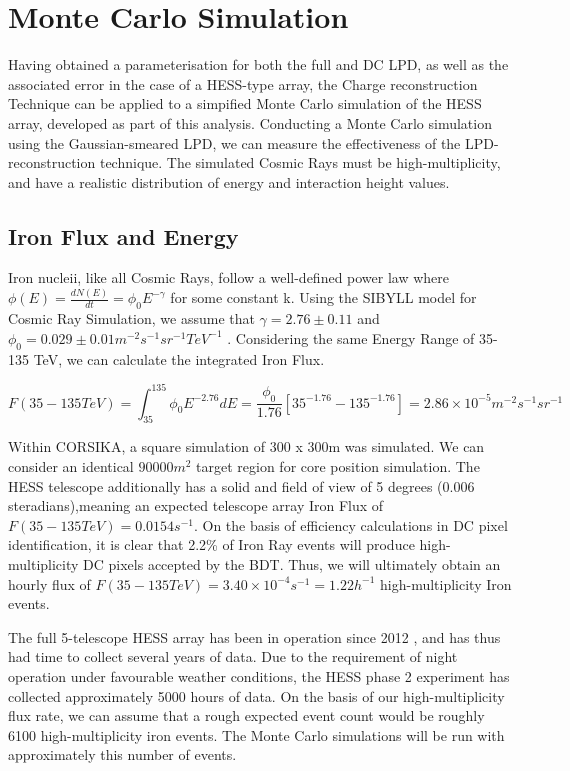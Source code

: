 \documentclass[11pt]{article}
\begin{document}
\section{Monte Carlo Simulation}
Having obtained a parameterisation for both the full and DC LPD, as well as the associated error in the case of a HESS-type array, the Charge reconstruction Technique can be applied to a simpified Monte Carlo simulation of the HESS array, developed as part of this analysis. Conducting a Monte Carlo simulation using the Gaussian-smeared LPD, we can measure the effectiveness of the LPD-reconstruction technique. The simulated Cosmic Rays must be high-multiplicity, and have a realistic distribution of energy and interaction height values.

\subsection{Iron Flux and Energy}
Iron nucleii, like all Cosmic Rays, follow a well-defined power law where $\phi(E) = \frac{dN(E)}{dt} = \phi_{0} E^{-\gamma} $ for some constant k. Using the SIBYLL model for Cosmic Ray Simulation, we assume that $ \gamma = 2.76 \pm 0.11 $ and $\phi_{0}=0.029 \pm 0.01 m^{-2} s^{-1} sr^{-1} TeV ^{-1}$ \cite{hess07}. Considering the same Energy Range of 35-135 TeV, we can calculate the integrated Iron Flux. 

\[ F(35-135TeV) = \int_{35}^{135} \phi_{0} E^{-2.76} dE = \frac{\phi_{0}}{1.76}[35^{-1.76} - 135^{-1.76}] = 2.86 \times 10^{-5} m^{-2} s^{-1} sr^{-1}\]

Within CORSIKA, a square simulation of 300 x 300m was simulated. We can consider an identical $90000 m^{2}$ target region for core position simulation. The HESS telescope additionally has a solid and field of view of 5 degrees (0.006 steradians),meaning an expected telescope array Iron Flux of $F(35-135TeV) = 0.0154 s^{-1}$. On the basis of efficiency calculations in DC pixel identification, it is clear that 2.2\% of Iron Ray events will produce high-multiplicity DC pixels accepted by the BDT. Thus, we will ultimately obtain an hourly flux of $F(35-135TeV) = 3.40 \times 10^{-4} s^{-1} = 1.22 h^{-1}$ high-multiplicity Iron events. 

The full 5-telescope HESS array has been in operation since 2012 \cite{hessCT5}, and has thus had time to collect several years of data. Due to the requirement of night operation under favourable weather conditions, the HESS phase 2 experiment has collected approximately 5000 hours of data. On the basis of our high-multiplicity flux rate, we can assume that a rough expected event count would be roughly 6100 high-multiplicity iron events. The Monte Carlo simulations will be run with approximately this number of events.
\end{document}
